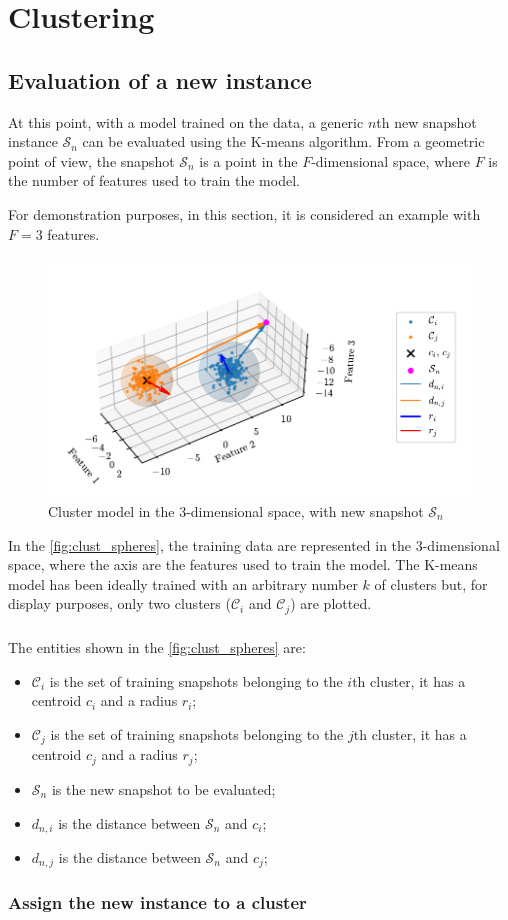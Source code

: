 \chapter{Clustering}

\section{Evaluation of a new instance}

At this point, with a model trained on the data, a generic $n$th new snapshot instance $\mathcal{S}_n$ can be evaluated using the K-means algorithm.
From a geometric point of view, the snapshot $\mathcal{S}_n$ is a point in the $F$-dimensional space, where $F$ is the number of features used to train the model.

For demonstration purposes, in this section, it is considered an example with $F=3$ features.

\begin{figure}[htbp]
  \centering
  \includegraphics[width=\textwidth]{images/Spheres_2.pdf}
\caption{Cluster model in the $3$-dimensional space, with new snapshot $\mathcal{S}_n$}
\label{fig:clust_spheres}
\end{figure}

In the \autoref{fig:clust_spheres}, the training data are represented in the $3$-dimensional space, where the axis are the features used to train the model. The K-means model has been ideally trained with an arbitrary number $k$ of clusters but, for display purposes, only two clusters  ($\mathcal{C}_i$ and $\mathcal{C}_j$) are plotted. 
\paragraph*{}
The entities shown in the \autoref{fig:clust_spheres} are:
\begin{itemize}
  \item $\mathcal{C}_i$ is the set of training snapshots belonging to the $i$th cluster, it has a centroid $c_i$ and a radius $r_i$;
  \item $\mathcal{C}_j$ is the set of training snapshots belonging to the $j$th cluster, it has a centroid $c_j$ and a radius $r_j$;
  \item $\mathcal{S}_n$ is the new snapshot to be evaluated;
  \item $d_{n,i}$ is the distance between $\mathcal{S}_n$ and $c_i$;
  \item $d_{n,j}$ is the distance between $\mathcal{S}_n$ and $c_j$;
\end{itemize}

\subsection{Assign the new instance to a cluster}

